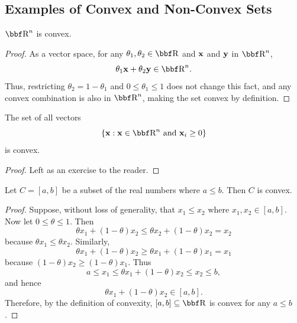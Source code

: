 \documentclass{article}
\begin{document}
\subsection{Examples of Convex and Non-Convex Sets}

\begin{example}[All of $\RR^n$]
    $\RR^n$ is convex.
\end{example}
\begin{proof}
    As a vector space, for any $\theta_1,\theta_2 \in \RR$ and ${\bf x}$ and
    ${\bf y}$ in $\RR^n$,
    \[
        \theta_1 \xx + \theta_2 \yy \in \RR^n.
    \]
    Thus, restricting $\theta_2 = 1-\theta_1$ and $0\leq\theta_1\leq1$
    does not change this fact, and any convex combination is also in
    $\RR^n$, making the set convex by definition.
\end{proof}

\begin{example}
    The set of all vectors
    \[
        \{\xx : \xx\in\RR^n \text{ and } \xx_i \geq 0\}
    \]
    is convex.
\end{example}
\begin{proof}
    Left as an exercise to the reader.
\end{proof}

\begin{example}
    \label{ex:closed-intervals-convex}
    Let $C = [a,b]$ be a subset of the real numbers where $a \leq b$.
    Then $C$ is convex.
\end{example}
\begin{proof}
    Suppose, without loss of generality, that $x_1 \leq x_2$ where
    $x_1,x_2 \in [a,b]$. Now let $0\leq\theta\leq1$. Then
    \[
        \theta x_1 + (1-\theta) x_2 \leq \theta x_2 + (1-\theta) x_2 = x_2
    \]
    because $\theta x_1 \leq \theta x_2$. Similarly,
    \[
        \theta x_1 + (1-\theta) x_2 \geq \theta x_1 + (1-\theta) x_1 = x_1
    \]
    because $(1-\theta) x_2 \geq (1-\theta) x_1$. Thus
    \[
        a \leq x_1 \leq \theta x_1 + (1-\theta) x_2 \leq x_2 \leq b,
    \]
    and hence
    \[
        \theta x_1 + (1-\theta) x_2 \in [a,b].
    \]
    Therefore, by the definition of convexity, $[a,b]\subseteq\RR$ is convex
    for any $a \leq b$.
\end{proof}
\end{document}
